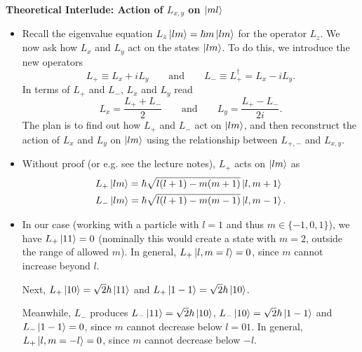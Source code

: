 \documentclass[11pt, a4paper]{article}
\newcommand{\eqtext}[1]{\qquad \text{#1} \qquad}
\begin{document}
\textbf{Theoretical Interlude: Action of $ L_{x, y} $ on $ \ket{ml} $}
\begin{itemize}
	\item Recall the eigenvalue equation $ L_{z} \ket{lm} = \hbar m \ket{lm} $ for the operator $ L_{z} $. We now ask how $ L_{x} $ and $ L_{y} $ act on the states $ \ket{lm} $. To do this, we introduce the new operators
	\begin{equation*}
		L_{+} \equiv L_{x} + i L_{y} \eqtext{and} L_{-} \equiv L_{+}^{\dagger} = L_{x} - i L_{y}.
	\end{equation*}
	In terms of $ L_{+} $ and $ L_{-} $, $ L_{x} $ and $ L_{y} $ read
	\begin{equation*}
		L_{x} = \frac{L_{+} + L_{-}}{2} \eqtext{and} L_{y} = \frac{L_{+} - L_{-}}{2i}.
	\end{equation*}
	The plan is to find out how $ L_{+} $ and $ L_{-} $ act on $ \ket{lm} $, and then reconstruct the action of $ L_{x} $ and $ L_{y} $ on $ \ket{lm} $ using the relationship between $ L_{+, -} $ and $ L_{x, y} $. 
	
	\item Without proof (or e.g. see the lecture notes), $ L_{+} $ acts on $ \ket{lm} $ as
	\begin{align*}
		&L_{+}\ket{lm} = \hbar \sqrt{l (l+1) - m(m+1)} \ket{l, m+1} \\
		&L_{-}\ket{lm} = \hbar \sqrt{l (l+1) - m(m-1)} \ket{l, m-1} .
	\end{align*}
	
	\item In our case (working with a particle with $ l = 1 $ and thus $ m \in \{-1, 0, 1\} $), we have $ L_{+}\ket{11} = 0 $ (nominally this would create a state with $ m = 2 $, outside the range of allowed $ m $). In general, $ L_{+}\ket{l, m=l} = 0 $, since $ m $  cannot increase beyond $ l $. 
	
	Next, $ L_{+}\ket{10} = \sqrt{2}\hbar \ket{11} $ and $ L_{+}\ket{1 -1} = \sqrt{2}\hbar \ket{10} $.
	
	Meanwhile, $ L_{-} $ produces $ L_{-}\ket{11} = \sqrt{2}\hbar \ket{10} $, $ L_{-}\ket{10} = \sqrt{2}\hbar \ket{1-1} $ and $ L_{-}\ket{1-1} = 0 $, since $ m $ cannot decrease below $ l = 01 $. In general, $ L_{+}\ket{l, m=-l} = 0 $, since $ m $  cannot decrease below $ -l $. 
	
\end{itemize}
\end{document}
